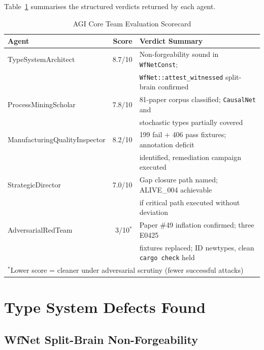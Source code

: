 Table~\ref{tab:eval-scorecard} summarises the structured verdicts returned by
each agent.

\begin{table}[ht]
  \centering
  \caption{AGI Core Team Evaluation Scorecard}
  \label{tab:eval-scorecard}
  \begin{tabular}{lrl}
    \toprule
    Agent & Score & Verdict Summary \\
    \midrule
    TypeSystemArchitect          & 8.7/10   & Non-forgeability sound in \texttt{WfNetConst}; \\
                                 &          & \texttt{WfNet::attest\_witnessed} split-brain confirmed \\
    ProcessMiningScholar         & 7.8/10   & 81-paper corpus classified; \texttt{CausalNet} and \\
                                 &          & stochastic types partially covered \\
    ManufacturingQualityInspector & 8.2/10  & 199 fail + 406 pass fixtures; annotation deficit \\
                                 &          & identified, remediation campaign executed \\
    StrategicDirector            & 7.0/10   & Gap closure path named; ALIVE\_004 achievable \\
                                 &          & if critical path executed without deviation \\
    AdversarialRedTeam           & 3/10$^*$ & Paper \#49 inflation confirmed; three E0425 \\
                                 &          & fixtures replaced; ID newtypes, clean \texttt{cargo check} held \\
    \bottomrule
    \multicolumn{3}{l}{$^*$Lower score = cleaner under adversarial scrutiny (fewer successful attacks)} \\
  \end{tabular}
\end{table}

\section{Type System Defects Found}
\label{sec:eval-typesystem}

\subsection{WfNet Split-Brain Non-Forgeability}

